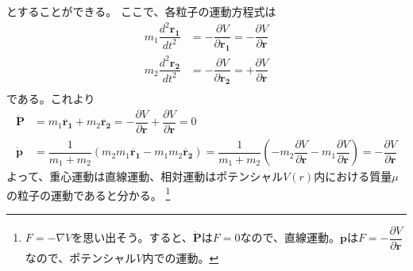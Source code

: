 \documentclass[a4paper,16pt]{jsarticle}
\begin{document}
とすることができる。
ここで、各粒子の運動方程式は
\begin{align}
	m_1 \dfrac{d^2 \bm{r_1}}{d t^2} &= - \dfrac{\partial V}{\partial \bm{r_1}} = - \dfrac{\partial V}{\partial \bm{r}} \\
	m_2 \dfrac{d^2 \bm{r_2}}{d t^2} &= - \dfrac{\partial V}{\partial \bm{r_2}} = + \dfrac{\partial V}{\partial \bm{r}} \\
\end{align}
である。これより
\begin{align}
	\dot{\bm{P}} &= m_1\ddot{\bm{r_1}} + m_2\ddot{\bm{r_2}} = - \dfrac{\partial V}{\partial \bm{r}} + \dfrac{\partial V}{\partial \bm{r}} = 0 \\
	\dot{\bm{p}} &= \dfrac{1}{m_1 + m_2}(m_2 m_1 \ddot{\bm{r_1}} - m_1 m_2 \ddot{\bm{r_2}}) =
	\dfrac{1}{m_1 + m_2}\left( -m_2 \dfrac{\partial V}{\partial \bm{r}} - m_1\dfrac{\partial V}{\partial \bm{r}} \right)
	= -\dfrac{\partial V}{\partial \bm{r}}
\end{align}
よって、重心運動は直線運動、相対運動はポテンシャル$V(r)$内における質量$\mu$の粒子の運動であると分かる。
\footnote{$F = -\nabla V$を思い出そう。すると、$\dot{\bm{P}}$は$F = 0$なので、直線運動。$\dot{\bm{p}}$は$F = - \dfrac{\partial V}{\partial \bm{r}}$なので、ポテンシャル$V$内での運動。}
\end{document}
